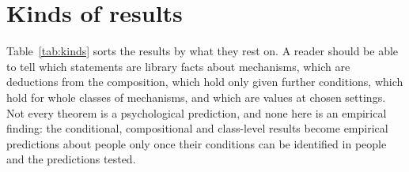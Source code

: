 \documentclass[11pt]{article}
\begin{document}
\section{Kinds of results}
\label{sec:kinds}

Table~\ref{tab:kinds} sorts the results by what they rest on. A reader should be able to tell which statements are library facts about mechanisms, which are deductions from the composition, which hold only given further conditions, which hold for whole classes of mechanisms, and which are values at chosen settings. Not every theorem is a psychological prediction, and none here is an empirical finding: the conditional, compositional and class-level results become empirical predictions about people only once their conditions can be identified in people and the predictions tested.
\end{document}
